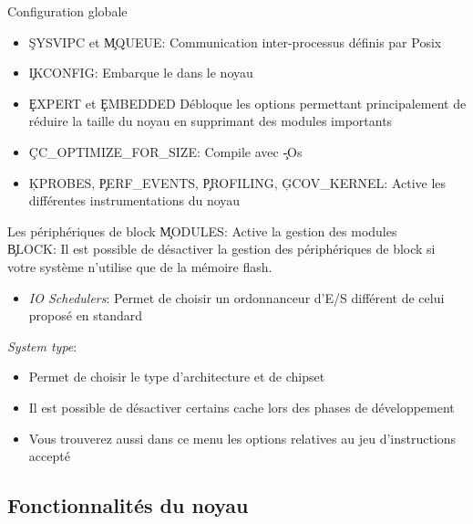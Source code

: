 \begin{frame}[fragile=singleslide]{Configuration globale}
  \begin{itemize} 
  \item  \c{SYSVIPC} et  \c{MQUEUE}:  Communication inter-processus
    définis par Posix
  \item \c{IKCONFIG}: Embarque le  dans le noyau 
  \item  \c{EXPERT} et  \c{EMBEDDED} Débloque  les  options permettant
    principalement  de réduire la  taille du  noyau en  supprimant des
    modules importants
  \item \c{CC_OPTIMIZE_FOR_SIZE}: Compile avec \c{-Os}
  \item \c{KPROBES},  \c{PERF_EVENTS}, \c{PROFILING}, \c{GCOV_KERNEL}:
    Active les différentes instrumentations du noyau
  \end{itemize} 
\end{frame}

\begin{frame}[fragile=singleslide]{Les périphériques de block}
  \c{MODULES}: Active la gestion des modules
  \\[2ex]
  \c{BLOCK}: Il est possible  de désactiver la gestion des périphériques
  de block si votre système n'utilise que de la mémoire flash.
  \begin{itemize} 
  \item \emph{IO  Schedulers}: Permet de choisir  un ordonnanceur d'E/S
    différent de celui proposé en standard
  \end{itemize} 
  \emph{System type}:
  \begin{itemize} 
  \item Permet de choisir le type d'architecture et de chipset
  \item Il est  possible de désactiver certains cache  lors des phases
    de développement
  \item Vous trouverez aussi dans  ce menu les options relatives au jeu
    d'instructions accepté
  \end{itemize}
\end{frame}

\subsection{Fonctionnalités du noyau}

